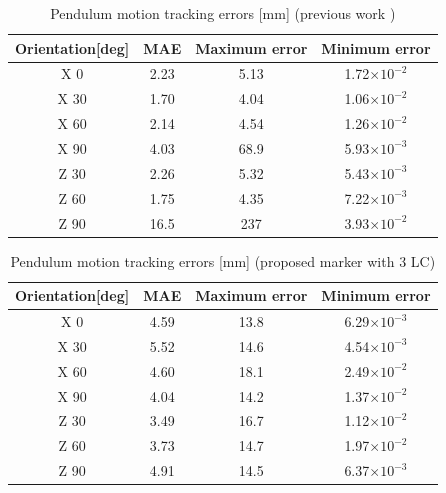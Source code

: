 \documentclass[journal,twoside,web]{ieeecolor}
\begin{document}
 \begin{table}[t]
  \begin{center}
  \caption{Pendulum motion tracking errors [mm] (previous work \cite{im3d+})}
  \label{pendulum-error_1LC}
  \begin{tabular}{c||c|c|c} \hline
    Orientation[deg] & MAE & Maximum error & Minimum error\\ \hline\hline
    X 0 & 2.23 & 5.13 & 1.72$\times10^{-2}$ \\
    X 30 & 1.70 & 4.04 & 1.06$\times10^{-2}$ \\
    X 60 & 2.14 & 4.54 & 1.26$\times10^{-2}$ \\
    X 90 & 4.03 & 68.9 & 5.93$\times10^{-3}$  \\
    Z 30 & 2.26 & 5.32 & 5.43$\times10^{-3}$ \\
    Z 60 & 1.75 & 4.35 & 7.22$\times10^{-3}$ \\
    Z 90 & 16.5 & 237 & 3.93$\times10^{-2}$ \\
  \end{tabular}
  \end{center}
\end{table}

\begin{table}[t]
  \begin{center}
  \caption{Pendulum motion tracking errors [mm] (proposed marker with 3 LC)}
  \label{pendulum-error_3LC}
  \begin{tabular}{c||c|c|c} \hline
    Orientation[deg] & MAE & Maximum error & Minimum error\\ \hline\hline
    X 0 & 4.59 & 13.8 & 6.29$\times10^{-3}$ \\
    X 30 & 5.52 & 14.6 & 4.54$\times10^{-3}$ \\
    X 60 & 4.60 & 18.1 & 2.49$\times10^{-2}$ \\
    X 90 & 4.04 & 14.2 & 1.37$\times10^{-2}$  \\
    Z 30 & 3.49 & 16.7 & 1.12$\times10^{-2}$ \\
    Z 60 & 3.73 & 14.7 & 1.97$\times10^{-2}$ \\
    Z 90 & 4.91 & 14.5 & 6.37$\times10^{-3}$ \\
  \end{tabular}
  \end{center}
\end{table}
\end{document}

